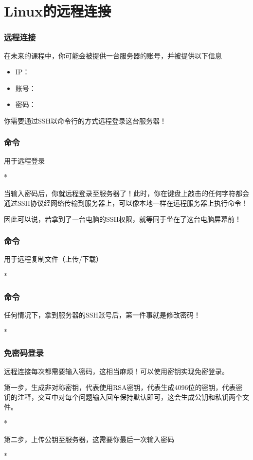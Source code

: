 \section{Linux的远程连接}

\begin{frame}
    \frametitle{远程连接}
    在未来的课程中，你可能会被提供一台服务器的账号，并被提供以下信息
    \begin{itemize}
        \item IP：
        \item 账号：
        \item 密码：
    \end{itemize}
    你需要通过SSH以命令行的方式远程登录这台服务器！
\end{frame}

\begin{frame}
    \frametitle{命令}
    用于远程登录
    \begin{Code}*
        
    \end{Code}
    当输入密码后，你就远程登录至服务器了！此时，你在键盘上敲击的任何字符都会通过SSH协议经网络传输到服务器上，可以像本地一样在远程服务器上执行命令！
    
    因此可以说，若拿到了一台电脑的SSH权限，就等同于坐在了这台电脑屏幕前！
\end{frame}

\begin{frame}
    \frametitle{命令}
    用于远程复制文件（上传/下载）
    \begin{Code}*
        
    \end{Code}
\end{frame}

\begin{frame}
    \frametitle{命令}
    任何情况下，拿到服务器的SSH账号后，第一件事就是修改密码！
    \begin{Code}*
        
    \end{Code}
\end{frame}

\begin{frame}
    \frametitle{免密码登录}
    远程连接每次都需要输入密码，这相当麻烦！可以使用密钥实现免密登录。

    第一步，生成非对称密钥，代表使用RSA密钥，代表生成4096位的密钥，代表密钥的注释，交互中对每个问题输入回车保持默认即可，这会生成公钥和私钥两个文件。
    \begin{Code}*
        
    \end{Code}
    第二步，上传公钥至服务器，这需要你最后一次输入密码
    \begin{Code}*
        
    \end{Code}
\end{frame}
